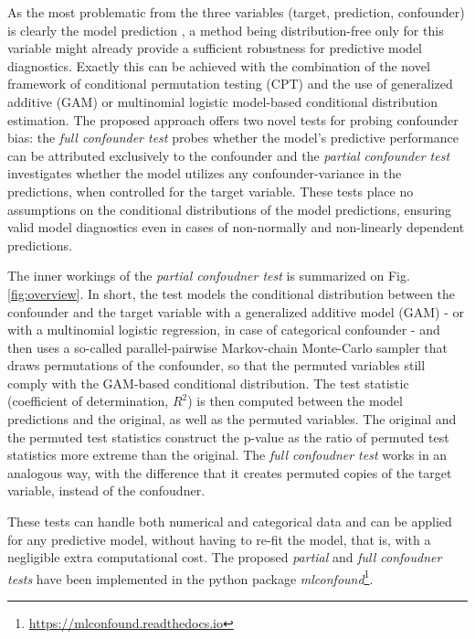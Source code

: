 \documentclass{article}
\begin{document}
As the most problematic from the three variables (target, prediction, confounder) is clearly the model prediction \citep{garcia2009study, kristensen2017whole}, a method being distribution-free only for this variable might already provide a sufficient robustness for predictive model diagnostics. Exactly this can be achieved with the combination of the novel framework of conditional permutation testing (CPT) \cite{berrett2020conditional} and the use of generalized additive (GAM)\citep{hastie1987generalized} or multinomial logistic model\cite{bennett1966multiple, jones1975proability}-based conditional distribution estimation. The proposed approach offers two novel tests for probing confounder bias: the \emph{full confounder test} probes whether the model's predictive performance can be attributed exclusively to the confounder and the \emph{partial confounder test} investigates whether the model utilizes any confounder-variance in the predictions, when controlled for the target variable.
These tests place no assumptions on the conditional distributions of the model predictions, ensuring valid model diagnostics even in cases of non-normally and non-linearly dependent predictions.

The inner workings of the \emph{partial confoudner test} is summarized on Fig. \ref{fig:overview}. In short, the test models the conditional distribution between the confounder and the target variable with a generalized additive model (GAM) - or with a multinomial logistic regression, in case of categorical confounder - and then uses a so-called parallel-pairwise Markov-chain Monte-Carlo sampler that draws permutations of the confounder, so that the permuted variables still comply with the GAM-based conditional distribution. The test statistic (coefficient of determination, $R^2$) is then computed between the model predictions and the original, as well as the permuted variables. The original and the permuted test statistics construct the p-value as the ratio of permuted test statistics more extreme than the original. The \emph{full confoudner test} works in an analogous way, with the difference that it creates permuted copies of the target variable, instead of the confoudner.

These tests can handle both numerical and categorical data and can be applied for any predictive model, without having to re-fit the model, that is, with a negligible extra computational cost.
The proposed \emph{partial} and \emph{full confoudner tests} have been implemented in the python package \emph{mlconfound}\footnote{\href{https://mlconfound.readthedocs.io}{https://mlconfound.readthedocs.io}}. 
\end{document}
